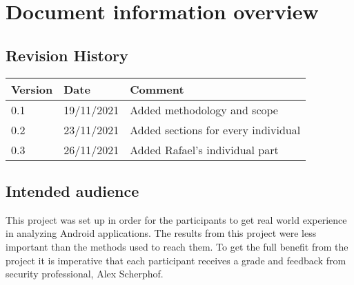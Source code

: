 \section*{Document information overview}
\subsection*{Revision History}

\begin{tabularx}{\textwidth}{|l|l|X|}
  \hline
  \textbf{Version} & \textbf{Date} & \textbf{Comment}                  \\ \hline
  0.1              & 19/11/2021    & Added methodology and scope       \\ \hline
  0.2              & 23/11/2021    & Added sections for every individual \\ \hline
  0.3              & 26/11/2021    & Added Rafael's individual part      \\ \hline
\end{tabularx}

\subsection*{Intended audience}

This project was set up in order for the participants to get real world experience in analyzing Android applications.
The results from this project were less important than the methods used to reach them.
To get the full benefit from the project it is imperative that each participant receives a grade and feedback from security professional, Alex Scherphof.

\newpage
